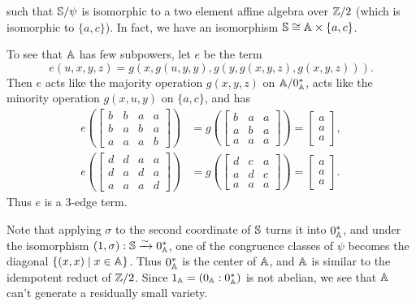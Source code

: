 \documentclass[letterpaper,11pt]{article}
\begin{document}
\begin{ex}
\[\]
such that $\mathbb{S}/\psi$ is isomorphic to a two element affine algebra over $\mathbb{Z}/2$ (which is isomorphic to $\{a,c\}$). In fact, we have an isomorphism $\mathbb{S} \cong \mathbb{A}\times \{a,c\}$.

To see that $\mathbb{A}$ has few subpowers, let $e$ be the term
\[
e(u,x,y,z) = g(x,g(u,y,y),g(y,g(x,y,z),g(x,y,z))).
\]
Then $e$ acts like the majority operation $g(x,y,z)$ on $\mathbb{A}/0^*_{\mathbb{A}}$, acts like the minority operation $g(x,u,y)$ on $\{a,c\}$, and has
\begin{align*}
e\left(\begin{bmatrix} b & b & a & a\\ b & a & b & a\\ a & a & a & b\end{bmatrix}\right) &= g\left(\begin{bmatrix} b & a & a\\ a & b & a\\ a & a & a\end{bmatrix}\right) = \begin{bmatrix} a\\ a\\ a\end{bmatrix},\\
e\left(\begin{bmatrix} d & d & a & a\\ d & a & d & a\\ a & a & a & d\end{bmatrix}\right) &= g\left(\begin{bmatrix} d & c & a\\ a & d & c\\ a & a & a\end{bmatrix}\right) = \begin{bmatrix} a\\ a\\ a\end{bmatrix}.
\end{align*}
Thus $e$ is a $3$-edge term.

Note that applying $\sigma$ to the second coordinate of $\mathbb{S}$ turns it into $0^*_{\mathbb{A}}$, and under the isomorphism $(1,\sigma) : \mathbb{S} \xrightarrow{\sim} 0^*_{\mathbb{A}}$, one of the congruence classes of $\psi$ becomes the diagonal $\{(x,x) \mid x \in \mathbb{A}\}$. Thus $0^*_{\mathbb{A}}$ is the center of $\mathbb{A}$, and $\mathbb{A}$ is similar to the idempotent reduct of $\mathbb{Z}/2$. Since $1_{\mathbb{A}} = (0_{\mathbb{A}} : 0^*_{\mathbb{A}})$ is not abelian, we see that $\mathbb{A}$ can't generate a residually small variety.


\end{ex}
\end{document}
